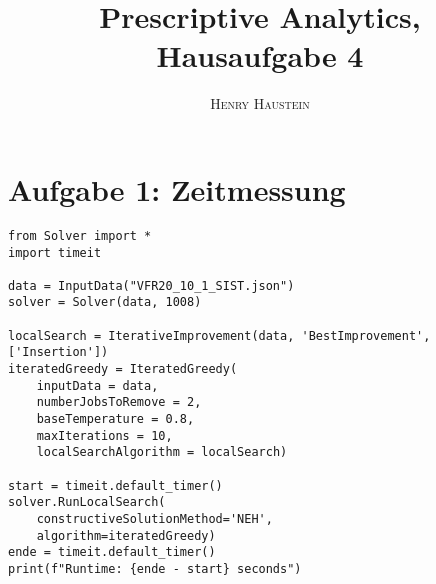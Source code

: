 \documentclass{article}
\title{\textbf{Prescriptive Analytics, Hausaufgabe 4}}
\author{\textsc{Henry Haustein}}
\date{}
\begin{document}
	\maketitle
	
	\section*{Aufgabe 1: Zeitmessung}
	\begin{lstlisting}
from Solver import *
import timeit

data = InputData("VFR20_10_1_SIST.json") 
solver = Solver(data, 1008)

localSearch = IterativeImprovement(data, 'BestImprovement', ['Insertion'])
iteratedGreedy = IteratedGreedy(
	inputData = data, 
	numberJobsToRemove = 2, 
	baseTemperature = 0.8, 
	maxIterations = 10,
	localSearchAlgorithm = localSearch)

start = timeit.default_timer()
solver.RunLocalSearch(
	constructiveSolutionMethod='NEH',
	algorithm=iteratedGreedy)
ende = timeit.default_timer()
print(f"Runtime: {ende - start} seconds")
	\end{lstlisting}
	
\end{document}
